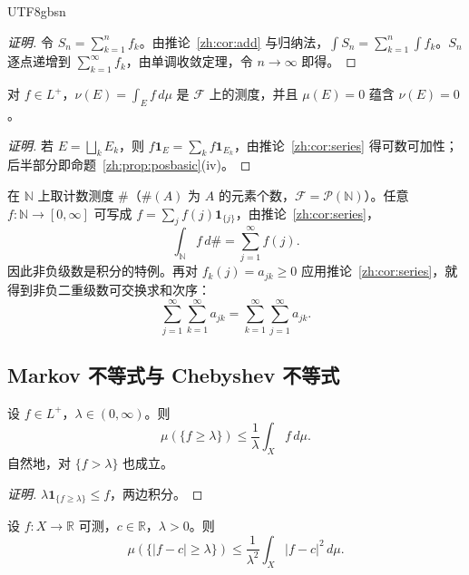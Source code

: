 \documentclass[11pt]{article}
\makeatletter
\newcommand{\envlabel}[1]{\protected@edef\@currentlabel{\themathenv}\label{#1}}
\makeatother
\begin{document}
\begin{CJK*}{UTF8}{gbsn}
\begin{proof}[证明]
令 $S_{n}=\sum_{k=1}^{n}f_{k}$。由推论~\ref{zh:cor:add} 与归纳法，$\int S_{n}=\sum_{k=1}^{n}\int f_{k}$。$S_{n}$ 逐点递增到 $\sum_{k=1}^{\infty}f_{k}$，由单调收敛定理，令 $n\to\infty$ 即得。
\end{proof}

\begin{corollary}\envlabel{zh:cor:measure}
对 $f\in L^{+}$，$\nu(E)=\int_{E}f\,d\mu$ 是 $\mathcal{F}$ 上的测度，并且 $\mu(E)=0$ 蕴含 $\nu(E)=0$。
\end{corollary}

\begin{proof}[证明]
若 $E=\bigsqcup_{k}E_{k}$，则 $f\mathbf{1}_{E}=\sum_{k}f\mathbf{1}_{E_{k}}$，由推论~\ref{zh:cor:series} 得可数可加性；后半部分即命题~\ref{zh:prop:posbasic}(iv)。
\end{proof}

\begin{example}
在 $\mathbb{N}$ 上取计数测度 $\#$（$\#(A)$ 为 $A$ 的元素个数，$\mathcal{F}=\mathcal{P}(\mathbb{N})$）。任意 $f:\mathbb{N}\to[0,\infty]$ 可写成 $f=\sum_{j}f(j)\mathbf{1}_{\{j\}}$，由推论~\ref{zh:cor:series}，
\[
\int_{\mathbb{N}}f\,d\#=\sum_{j=1}^{\infty}f(j).
\]
因此非负级数是积分的特例。再对 $f_{k}(j)=a_{jk}\geq0$ 应用推论~\ref{zh:cor:series}，就得到非负二重级数可交换求和次序：
\[
\sum_{j=1}^{\infty}\sum_{k=1}^{\infty}a_{jk}=\sum_{k=1}^{\infty}\sum_{j=1}^{\infty}a_{jk}.
\]
\end{example}

\subsection{Markov 不等式与 Chebyshev 不等式}

\begin{proposition}\envlabel{zh:prop:markov}
设 $f\in L^{+}$，$\lambda\in(0,\infty)$。则
\[
\mu(\{f\geq\lambda\})\leq\frac{1}{\lambda}\int_{X}f\,d\mu.
\]
自然地，对 $\{f>\lambda\}$ 也成立。
\end{proposition}

\begin{proof}[证明]
$\lambda\mathbf{1}_{\{f\geq\lambda\}}\leq f$，两边积分。
\end{proof}

\begin{corollary}
设 $f:X\to\mathbb{R}$ 可测，$c\in\mathbb{R}$，$\lambda>0$。则
\[
\mu(\{|f-c|\geq\lambda\})\leq\frac{1}{\lambda^{2}}\int_{X}|f-c|^{2}\,d\mu.
\]
\end{corollary}


\end{CJK*}
\end{document}
